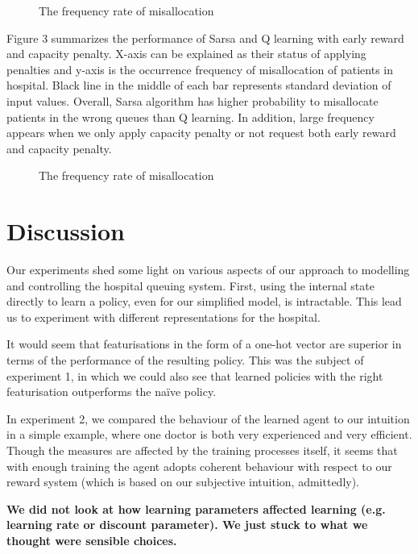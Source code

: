 \documentclass[11point]{article}
\newcommand{\note}[1]{\textbf{#1}}
\begin{document}
\begin{figure}
    \centering
    
    \caption{The frequency rate of misallocation}
    \label{fig:misalloc_dist}
\end{figure}

Figure 3 summarizes the performance of Sarsa and Q learning with early reward and capacity penalty. X-axis can be explained as their status of applying penalties and y-axis is the occurrence frequency of misallocation of patients in hospital. Black line in the middle of each bar represents standard deviation of input values. Overall, Sarsa algorithm has higher probability to misallocate patients in the wrong queues than Q learning. In addition, large frequency appears when we only apply capacity penalty or not request both early reward and capacity penalty.

\begin{figure}
    \centering
    
    \caption{The frequency rate of misallocation}
    \label{fig:penalty_diagram}
\end{figure}


\section{Discussion}
Our experiments shed some light on various aspects of our approach to modelling and controlling the hospital queuing system.
First, using the internal state directly to learn a policy, even for our simplified model, is intractable. This lead us to experiment with different representations for the hospital.

It would seem that featurisations in the form of a one-hot vector are superior in terms of the performance of the resulting policy.
This was the subject of experiment 1, in which we could also see that learned policies with the right featurisation outperforms the naïve policy.

In experiment 2, we compared the behaviour of the learned agent to our intuition in a simple example, where one doctor is both very experienced and very efficient.
Though the measures are affected by the training processes itself, it seems that with enough training the agent adopts coherent behaviour with respect to our reward system (which is based on our subjective intuition, admittedly).


\note{We did not look at how learning parameters affected learning (e.g. learning rate or discount parameter). We just stuck to what we thought were sensible choices.}
\end{document}

